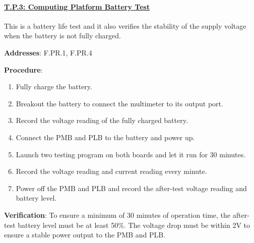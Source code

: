 \paragraph{\underline{T.P.3: Computing Platform Battery Test}}

This is a battery life test and it also verifies the stability of the supply voltage when the battery is not fully charged.

\textbf{Addresses}: F.PR.1, F.PR.4

\textbf{Procedure}:
\begin{enumerate}[noitemsep]
    \item Fully charge the battery.
    \item Breakout the battery to connect the multimeter to its output port.
    \item Record the voltage reading of the fully charged battery. 
    \item Connect the PMB and PLB to the battery and power up.
    \item Launch two testing program on both boards and let it run for 30 minutes.
    \item Record the voltage reading and current reading every minute.
    \item Power off the PMB and PLB and record the after-test voltage reading and battery level.
\end{enumerate}

\textbf{Verification}: 
To ensure a minimum of 30 minutes of operation time, the after-test battery level must be at least 50\%. The voltage drop must be within 2V to ensure a stable power output to the PMB and PLB.
